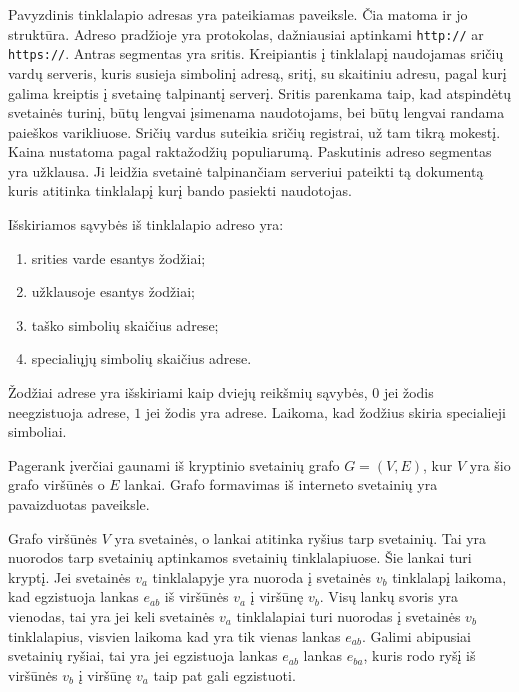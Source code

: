 Pavyzdinis tinklalapio adresas yra pateikiamas  paveiksle. Čia matoma ir jo struktūra. Adreso pradžioje yra protokolas, dažniausiai aptinkami \texttt{http://} ar \texttt{https://}. Antras segmentas yra sritis. Kreipiantis į tinklalapį naudojamas sričių vardų serveris, kuris susieja simbolinį adresą, sritį, su skaitiniu adresu, pagal kurį galima kreiptis į svetainę talpinantį serverį. Sritis parenkama taip, kad atspindėtų svetainės turinį, būtų lengvai įsimenama naudotojams, bei būtų lengvai randama paieškos varikliuose. Sričių vardus suteikia sričių registrai, už tam tikrą mokestį. Kaina nustatoma pagal raktažodžių populiarumą. Paskutinis adreso segmentas yra užklausa. Ji leidžia svetainė talpinančiam serveriui pateikti tą dokumentą kuris atitinka tinklalapį kurį bando pasiekti naudotojas.

Išskiriamos sąvybės iš tinklalapio adreso yra:
\begin{enumerate}
\item srities varde esantys žodžiai;
\item užklausoje esantys žodžiai;
\item taško simbolių skaičius adrese;
\item specialiųjų simbolių skaičius adrese.
\end{enumerate}
Žodžiai adrese yra išskiriami kaip dviejų reikšmių sąvybės, $0$ jei žodis neegzistuoja adrese, $1$ jei žodis yra adrese. Laikoma, kad žodžius skiria specialieji simboliai.

Pagerank įverčiai gaunami iš kryptinio svetainių grafo $G = (V, E)$, kur $V$ yra šio grafo viršūnės o $E$ lankai. Grafo formavimas iš interneto svetainių yra pavaizduotas  paveiksle.

Grafo viršūnės $V$ yra svetainės, o lankai atitinka ryšius tarp svetainių. Tai yra nuorodos tarp svetainių aptinkamos svetainių tinklalapiuose. Šie lankai turi kryptį. Jei svetainės $v_a$ tinklalapyje yra nuoroda į svetainės $v_b$ tinklalapį laikoma, kad egzistuoja lankas $e_{ab}$ iš viršūnės $v_a$ į viršūnę $v_b$. Visų lankų svoris yra vienodas, tai yra jei keli svetainės $v_a$ tinklalapiai turi nuorodas į svetainės $v_b$ tinklalapius, visvien laikoma kad yra tik vienas lankas $e_{ab}$. Galimi abipusiai svetainių ryšiai, tai yra jei egzistuoja lankas $e_{ab}$ lankas $e_{ba}$, kuris rodo ryšį iš viršūnės $v_b$ į viršūnę $v_a$ taip pat gali egzistuoti.


